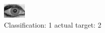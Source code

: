\begin{figure}[h!]
\begin{center}
\includegraphics[width=0.60\columnwidth]{figures/ID2041_class_1_target_2.png}
\end{center}
\caption{ Classification: 1 actual target: 2}
\label{fig:ID2041_class_1_target_2}
\end{figure}
